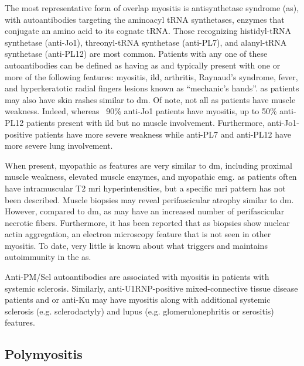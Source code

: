 The most representative form of overlap myositis is antisynthetase syndrome (\gls{as}), with autoantibodies targeting the aminoacyl tRNA synthetases, enzymes that conjugate an amino acid to its cognate tRNA.\cite{PinalFernandez2017a,TralleroAraguas2016} Those recognizing histidyl-tRNA synthetase (anti-Jo1), threonyl-tRNA synthetase (anti-PL7), and alanyl-tRNA synthetase (anti-PL12) are most common.\cite{PinalFernandez2017a,TralleroAraguas2016} Patients with any one of these autoantibodies can be defined as having \gls{as} and typically present with one or more of the following features: myositis, \gls{ild}, arthritis, Raynaud's syndrome, fever, and hyperkeratotic radial fingers lesions known as “mechanic’s hands”.\cite{SelvaOCallaghan2018} \gls{as} patients may also have skin rashes similar to \gls{dm}.\cite{SelvaOCallaghan2018} Of note, not all \gls{as} patients have muscle weakness. Indeed, whereas ~90\% anti-Jo1 patients have myositis, up to 50\% anti-PL12 patients present with \gls{ild} but no muscle involvement.\cite{PinalFernandez2017a} Furthermore, anti-Jo1-positive patients have more severe weakness while anti-PL7 and anti-PL12 have more severe lung involvement.\cite{PinalFernandez2017a,TralleroAraguas2016}

When present, myopathic \gls{as} features are very similar to \gls{dm}, including proximal muscle weakness, elevated muscle enzymes, and myopathic \gls{emg}.\cite{SelvaOCallaghan2018} \gls{as} patients often have intramuscular T2 \gls{mri} hyperintensities, but a specific \gls{mri} pattern has not been described.\cite{Andersson2017} Muscle biopsies may reveal perifascicular atrophy similar to \gls{dm}. However, compared to \gls{dm}, \gls{as} may have an increased number of perifascicular necrotic fibers.\cite{MescamMancini2015,Noguchi2017} Furthermore, it has been reported that \gls{as} biopsies show nuclear actin aggregation, an electron microscopy feature that is not seen in other myositis.\cite{Stenzel2015} To date, very little is known about what triggers and maintains autoimmunity in the \gls{as}.

Anti-PM/Scl autoantibodies are associated with myositis in patients with systemic sclerosis.\cite{GuillenDelCastillo2014} Similarly, anti-U1RNP-positive mixed-connective tissue disease patients and or anti-Ku may have myositis along with additional systemic sclerosis (e.g. sclerodactyly) and lupus (e.g. glomerulonephritis or serositis) features.\cite{Rigolet2012,EscolaVerge2017}

\subsection{Polymyositis}

